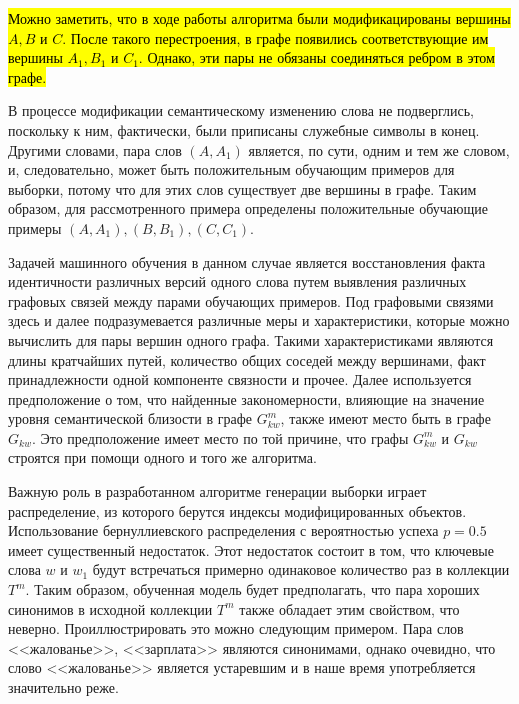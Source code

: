 \hl{Можно заметить, что в ходе работы алгоритма были модификацированы вершины $A, B$ и $C$. После такого перестроения, в графе появились соответствующие им вершины $A_1, B_1$ и $C_1$. Однако, эти пары не обязаны соединяться ребром в этом графе.}

В процессе модификации семантическому изменению слова не подверглись, поскольку к ним, фактически, были приписаны служебные символы в конец.  Другими словами, пара слов $(A, A_1)$ является, по сути, одним и тем же словом, и, следовательно, может быть положительным обучающим примеров для выборки, потому что для этих слов существует две вершины в графе. Таким образом, для рассмотренного примера определены положительные обучающие примеры $(A, A_1), (B, B_1), (C, C_1)$. 

Задачей машинного обучения в данном случае является восстановления факта идентичности различных версий одного слова путем выявления различных графовых связей между парами обучающих примеров. Под графовыми связями здесь и далее подразумевается различные меры и характеристики, которые можно вычислить для пары вершин одного графа. Такими характеристиками являются длины кратчайших путей, количество общих соседей между вершинами, факт принадлежности одной компоненте связности и прочее. Далее используется предположение о том, что найденные закономерности, влияющие на значение уровня семантической близости в графе $G^{m}_{kw}$, также имеют место быть в графе $G_{kw}$. Это предположение имеет место по той причине, что графы $G^{m}_{kw}$ и $G_{kw}$ строятся при помощи одного и того же алгоритма.

Важную роль в разработанном алгоритме генерации выборки играет распределение, из которого берутся индексы модифицированных объектов. Использование бернуллиевского распределения  с вероятностью успеха $p=0.5$ имеет существенный недостаток. Этот недостаток состоит в том, что ключевые слова $w$ и $w_1$ будут встречаться примерно одинаковое количество раз в коллекции $T^m$. Таким образом, обученная модель будет предполагать, что пара хороших синонимов в исходной коллекции $T^m$ также обладает этим свойством, что неверно. Проиллюстрировать это можно следующим примером. Пара слов <<жалованье>>, <<зарплата>> являются синонимами, однако очевидно, что слово <<жалованье>> является устаревшим и в наше время употребляется значительно реже. 

